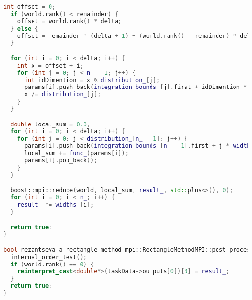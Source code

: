 \documentclass[12pt]{article}
\begin{document}
\begin{lstlisting}[language=C++]
  int offset = 0;
  if (world.rank() < remainder) {
    offset = world.rank() * delta;
  } else {
    offset = remainder * (delta + 1) + (world.rank() - remainder) * delta;
  }

  for (int i = 0; i < delta; i++) {
    int x = offset + i;
    for (int j = 0; j < n_ - 1; j++) {
      int idDimention = x % distribution_[j];
      params[i].push_back(integration_bounds_[j].first + idDimention * widths_[j] + widths_[j] / 2);
      x /= distribution_[j];
    }
  }

  double local_sum = 0.0;
  for (int i = 0; i < delta; i++) {
    for (int j = 0; j < distribution_[n_ - 1]; j++) {
      params[i].push_back(integration_bounds_[n_ - 1].first + j * widths_[n_ - 1] + widths_[n_ - 1] / 2);
      local_sum += func_(params[i]);
      params[i].pop_back();
    }
  }

  boost::mpi::reduce(world, local_sum, result_, std::plus<>(), 0);
  for (int i = 0; i < n_; i++) {
    result_ *= widths_[i];
  }

  return true;
}

bool rezantseva_a_rectangle_method_mpi::RectangleMethodMPI::post_processing() {
  internal_order_test();
  if (world.rank() == 0) {
    reinterpret_cast<double*>(taskData->outputs[0])[0] = result_;
  }
  return true;
}
\end{lstlisting}
\end{document}
